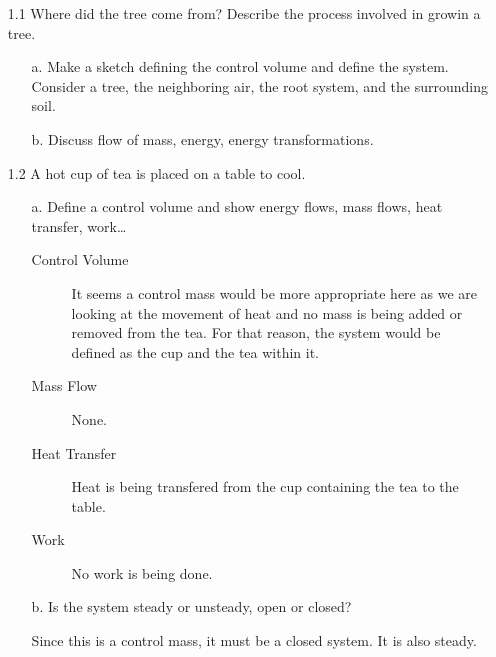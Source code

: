 \documentclass[10pt, a4paper]{article}
\begin{document}

\begin{enumerate}
  \item[1.1] Where did the tree come from? Describe the process involved in growin a tree.
    \begin{enumerate}
      \item[a.] Make a sketch defining the control volume and define the system. Consider a tree, the neighboring air, the root system, and the surrounding soil.
      \item[b.] Discuss flow of mass, energy, energy transformations.
    \end{enumerate}

  \item[1.2] A hot cup of tea is placed on a table to cool.
    \begin{enumerate}
      \item[a.] Define a control volume and show energy flows, mass flows, heat transfer, work\dots
        \begin{description}
          \item[Control Volume] It seems a control mass would be more appropriate here as we are looking at the movement of heat and no mass is being added or removed from the tea. For that reason, the system would be defined as the cup and the tea within it.
          \item[Mass Flow] None.
          \item[Heat Transfer] Heat is being transfered from the cup containing the tea to the table.
          \item[Work] No work is being done.
        \end{description}
      \item[b.] Is the system steady or unsteady, open or closed?
        
        Since this is a control mass, it must be a closed system. It is also steady.
    \end{enumerate}


\end{enumerate}
\end{document}
